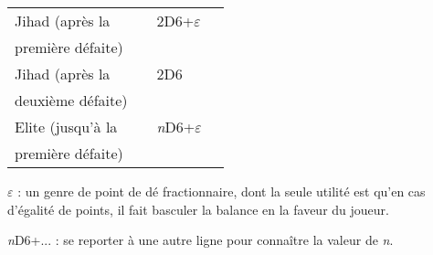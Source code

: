 \documentclass[a4paper,twocolumn]{article}
\newenvironment{texte}{\rmfamily\footnotesize}{}
\newcommand{\eps}[0]{$\varepsilon$}
\begin{document}
\begin{texte}
\begin{tabular}[t]{|p{30mm}|p{16mm}|p{10mm}|p{10mm}|}
\hline
 Jihad (après la        &                     &       2D6+\eps       &                   \\
 première défaite)      &                     &                      &                   \\
\hline
 Jihad (après la        &                     &         2D6          &                   \\
 deuxième défaite)      &                     &                      &                   \\
\hline
 Elite (jusqu'à la      &                     & \textit{n}D6+\eps    &                   \\
 première défaite)      &                     &                      &                   \\
\hline


 \end{tabular}

\eps{} : un genre de point de dé fractionnaire, dont la seule utilité est qu'en cas d'égalité de points, il fait basculer la balance en la faveur du joueur.

\textit{n}D6+... : se reporter à une autre ligne pour connaître la valeur de \textit{n}.

\end{texte}
\end{document}
